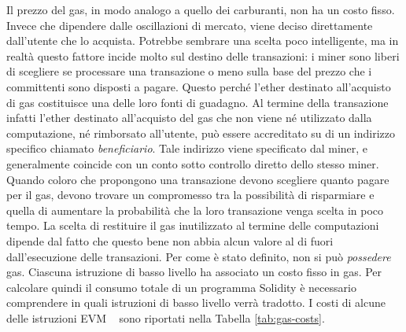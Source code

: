 \indent Il prezzo del gas, in modo analogo a quello dei carburanti, non ha un costo fisso. Invece che dipendere dalle oscillazioni di mercato, viene deciso direttamente dall'utente che lo acquista.
Potrebbe sembrare una scelta poco intelligente, ma in realtà questo fattore incide molto sul destino delle transazioni: i miner sono liberi di scegliere se processare una transazione o meno sulla base del prezzo che i committenti sono disposti a pagare. Questo perché l'ether destinato all'acquisto di gas costituisce una delle loro fonti di guadagno. Al termine della transazione infatti l'ether destinato all'acquisto del gas che non viene né utilizzato dalla computazione, né rimborsato all'utente, può essere accreditato su di un indirizzo specifico chiamato \textit{beneficiario}. Tale indirizzo viene specificato dal miner, e generalmente coincide con un conto sotto controllo diretto dello stesso miner. Quando coloro che propongono una transazione devono scegliere quanto pagare per il gas, devono trovare un compromesso tra la possibilità di risparmiare e quella di aumentare la probabilità che la loro transazione venga scelta in poco tempo.\newline
\indent La scelta di restituire il gas inutilizzato al termine delle computazioni dipende dal fatto che questo bene non abbia alcun valore al di fuori dall'esecuzione delle transazioni. Per come è stato definito, non si può \textit{possedere} gas.\newline
\indent Ciascuna istruzione di basso livello ha associato un costo fisso in gas. Per calcolare quindi il consumo totale di un programma Solidity è necessario comprendere in quali istruzioni di basso livello verrà tradotto. I costi di alcune delle istruzioni EVM ~\cite{wood2014ethereum} sono riportati nella Tabella \ref{tab:gas-costs}.

